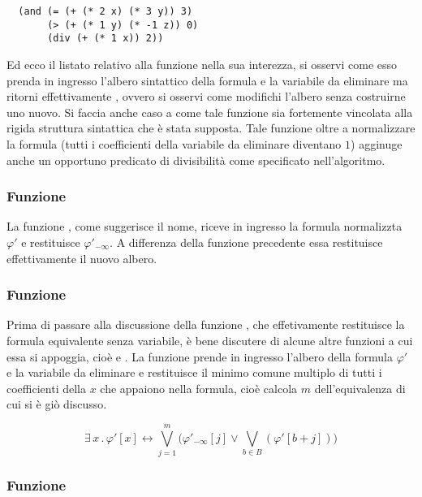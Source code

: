 \documentclass[11pt,letterpaper,twoside]{article}
\begin{document}
\begin{verbatim}
  (and (= (+ (* 2 x) (* 3 y)) 3)
       (> (+ (* 1 y) (* -1 z)) 0)
       (div (+ (* 1 x)) 2))
\end{verbatim}

Ed ecco il listato relativo alla funzione  nella
sua interezza, si osservi come esso prenda in ingresso l'albero sintattico della
formula e la variabile da eliminare ma ritorni effettivamente ,
ovvero si osservi come modifichi l'albero senza costruirne uno nuovo. Si faccia
anche caso a come tale funzione sia fortemente vincolata alla rigida struttura
sintattica che è stata supposta. Tale funzione oltre a normalizzare la formula
(tutti i coefficienti della variabile da eliminare diventano $1$) agginuge anche
un opportuno predicato di divisibilità come specificato nell'algoritmo.

\subsubsection{Funzione }

La funzione , come suggerisce il nome, riceve in ingresso la
formula normalizzta $\varphi'$ e restituisce $\varphi'_{- \infty}$. A differenza
della funzione precedente essa restituisce effettivamente il nuovo albero.

\subsubsection{Funzione }

Prima di passare alla discussione della funzione , che
effetivamente restituisce la formula equivalente senza variabile, è bene
discutere di alcune altre funzioni a cui essa si appoggia, cioè  e
.
La funzione  prende in ingresso
l'albero della formula $\varphi'$ e la variabile da eliminare e restituisce il
minimo comune multiplo di tutti i coefficienti della $x$ che appaiono nella
formula, cioè calcola $m$ dell'equivalenza di cui si è giò discusso.

$$ \exists \, x \, . \, \varphi'[x] \longleftrightarrow \bigvee_{j=1}^m \Big(
\varphi'_{- \infty}[j] \lor \bigvee_{b \in B}(\varphi'[b+j]) \Big)$$

\subsubsection{Funzione }
\end{document}
